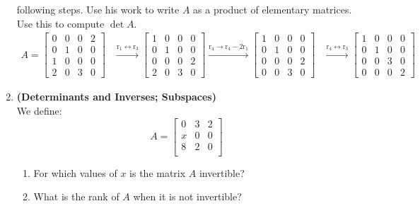 \documentclass[red]{tutorial}
\newcommand{\row}[1]{\mathrm{r}_{#1}}
\newcommand{\mat}[1]{\begin{bmatrix} #1 %
\end{bmatrix}}
\theoremstyle{definition}
\theoremstyle{theorem}
\begin{document}
\begin{tutorial}
\begin{enumerate}
      following steps. Use his work to write $A$ as a 
      product of elementary matrices. Use this to compute $\det A$.
      \begin{align*}
        A = \begin{bmatrix}
          0 & 0 & 0 & 2 \\
          0 & 1 & 0 & 0 \\
          1 & 0 & 0 & 0 \\
          2 & 0 & 3 & 0
        \end{bmatrix}
        &\xrightarrow{\row{1} \leftrightarrow \row{3}}
        \begin{bmatrix}
          1 & 0 & 0 & 0 \\
          0 & 1 & 0 & 0 \\
          0 & 0 & 0 & 2 \\
          2 & 0 & 3 & 0
        \end{bmatrix}
        \xrightarrow{\row{4} \to \row{4}-2\row{1}}
        \begin{bmatrix}
          1 & 0 & 0 & 0 \\
          0 & 1 & 0 & 0 \\
          0 & 0 & 0 & 2 \\
          0 & 0 & 3 & 0
        \end{bmatrix}
        &\xrightarrow{\row{4} \leftrightarrow \row{3}}
        \begin{bmatrix}
          1 & 0 & 0 & 0 \\
          0 & 1 & 0 & 0 \\
          0 & 0 & 3 & 0 \\
          0 & 0 & 0 & 2
        \end{bmatrix}
      \end{align*}
    \pagebreak %
    \item \label{q:determinants} \textbf{(Determinants and 
      Inverses; Subspaces)}\\
      We define:
      \begin{equation*}
        A =
        \mat{
          0 & 3 & 2 \\
          x & 0 & 0 \\
          8 & 2 & 0 \\
        }
      \end{equation*}
      \begin{enumerate}
        \item For which values of $x$ is the matrix $A$ invertible?
        \item What is the rank of $A$ when it is not invertible?

\end{enumerate}
\end{enumerate}
\end{tutorial}
\end{document}
